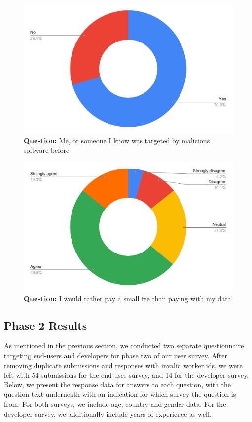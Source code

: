 \begin{figure}[H]
  \centering
  \includegraphics[width=13cm]{thesis/paper/images/p1_q15.pdf}
  \textbf{Question:} Me, or someone I know was targeted by malicious software before
\end{figure}

\begin{figure}[H]
  \centering
  \includegraphics[width=13cm]{thesis/paper/images/p1_q16.pdf}
  \textbf{Question:} I would rather pay a small fee than paying with my data
\end{figure}


\newpage
\subsection{Phase 2 Results}

As mentioned in the previous section, we conducted two separate questionnaire targeting end-users and developers for phase two of our user survey. After removing duplicate submissions and responses with invalid worker ids, we were left with 54 submissions for the end-uses survey, and 14 for the developer survey. Below, we present the response data for answers to each question, with the question text underneath with an indication for which survey the question is from. For both surveys, we include age, country and gender data. For the developer survey, we additionally include years of experience as well.



